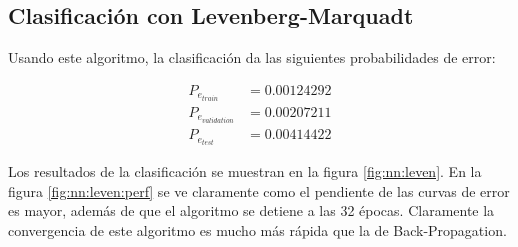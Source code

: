 \documentclass[11pt]{article} %
\begin{document}
\subsection{Clasificación con Levenberg-Marquadt}

Usando este algoritmo, la clasificación da las siguientes probabilidades de error:

\begin{align}
P_{e_{train}} &= 0.00124292 \\
P_{e_{validation}} &= 0.00207211 \\
P_{e_{test}} &= 0.00414422
\end{align}

Los resultados de la clasificación se muestran en la figura \ref{fig:nn:leven}. En la figura \ref{fig:nn:leven:perf} se ve claramente como el pendiente de las curvas de error es mayor, además de que el algoritmo se detiene a las 32 épocas. Claramente la convergencia de este algoritmo es mucho más rápida que la de Back-Propagation.
\end{document}
